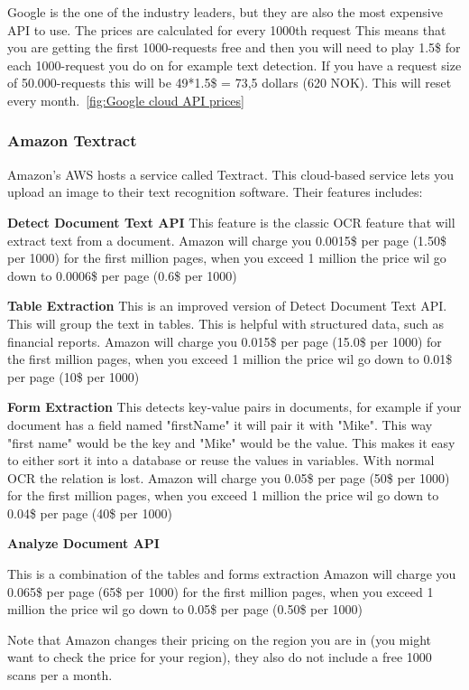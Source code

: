 Google is the one of the industry leaders, but they are also the most expensive API to use.
The prices are calculated for every 1000th request
This means that you are getting the first 1000-requests free and then you will need to play 1.5\$ for each 1000-request you do on for example text detection.
If you have a request size of 50.000-requests this will be 49*1.5\$ = 73,5 dollars (620 NOK).
This will reset every month.~\ref{fig:Google cloud API prices}

\subsubsection{Amazon Textract}\label{subsubsec:API_Amazon}

Amazon's AWS hosts a service called Textract.
This cloud-based service lets you upload an image to their text recognition software.
Their features includes:

\textbf{Detect Document Text API}
This feature is the classic OCR feature that will extract text from a document.
Amazon will charge you 0.0015\$ per page (1.50\$ per 1000) for the first million pages, when you exceed 1 million the price wil go down to
0.0006\$ per page (0.6\$ per 1000)

\textbf{Table Extraction}
This is an improved version of Detect Document Text API. This will group the text in tables.
This is helpful with structured data, such as financial reports.
Amazon will charge you 0.015\$ per page (15.0\$ per 1000) for the first million pages, when you exceed 1 million the price wil go down to
0.01\$ per page (10\$ per 1000)

\textbf{Form Extraction}
This detects key-value pairs in documents, for example if your document has a field named "firstName" it will pair
it with "Mike".
This way "first name" would be the key and "Mike" would be the value.
This makes it easy to either sort it into a database or reuse the values in variables.
With normal OCR the relation is lost.
Amazon will charge you 0.05\$ per page (50\$ per 1000) for the first million pages, when you exceed 1 million the price wil go down to
0.04\$ per page (40\$ per 1000)

\textbf{Analyze Document API}

This is a combination of the tables and forms extraction
Amazon will charge you 0.065\$ per page (65\$ per 1000) for the first million pages, when you exceed 1 million the price wil go down to
0.05\$ per page (0.50\$ per 1000)

Note that Amazon changes their pricing on the region you are in (you might want to check the price for your region), they also do not include a free 1000 scans per a month.

